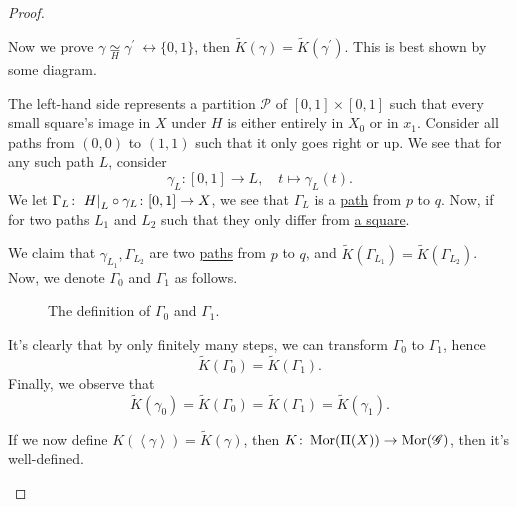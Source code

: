 \begin{proof}
\begin{itemize}
		      Now we prove \(\gamma \underset{H}{\simeq }\gamma ^\prime \  \rel \{0, 1\}\), then \(\widetilde{K} (\gamma ) = \widetilde{K} (\gamma ^\prime )\).
		      This is best shown by some diagram.
		      \begin{figure}[H]
			      \centering
			      \label{fig:pf:thm:Seifert-Van-Kampen-Theorem-on-groupoid-2}
		      \end{figure}
		      The left-hand side represents a partition \(\mathcal{P} \) of \([0, 1]\times [0, 1]\) such that every small square's image in \(X\) under \(H\) is either entirely in \(X_0\)
		      or in \(x_1\). Consider all paths from \((0, 0)\) to \((1, 1)\) such that it only goes right or up. We see that for any such path \(L\), consider
		      \[
			      \gamma _{L} \colon [0, 1]\to L, \quad t\mapsto \gamma _{L} (t).
		      \]
		      We let \(\Gamma _{L} \colon \left.H\right\vert_{L}^{} \circ \gamma _{L} \colon [0, 1]\to X\), we see that \(\Gamma _{L} \) is a \hyperref[def:path]{path} from \(p\) to \(q\). Now, if
		      for two paths \(L_1\) and \(L_2\) such that they only differ from \underline{a square}.
		      \begin{figure}[H]
			      \centering
			      \label{fig:pf:thm:Seifert-Van-Kampen-Theorem-on-groupoid-3}
		      \end{figure}
		      We claim that \(\gamma _{L_1}, \Gamma _{L_2}\) are two \hyperref[def:path]{paths} from \(p\) to \(q\), and \(\widetilde{K} (\Gamma _{L_1}) = \widetilde{K} (\Gamma _{L_2})\).
		      Now, we denote \(\Gamma _0\) and \(\Gamma _1\) as follows.
		      \begin{figure}[H]
			      \centering
			      \caption{The definition of \(\Gamma _0\) and \(\Gamma _1\).}
			      \label{fig:pf:thm:Seifert-Van-Kampen-Theorem-on-groupoid-4}
		      \end{figure}
		      It's clearly that by only finitely many steps, we can transform \(\Gamma _0\) to \(\Gamma _1\), hence
		      \[
			      \widetilde{K} (\Gamma _0) = \widetilde{K} (\Gamma _1).
		      \]
		      Finally, we observe that
		      \[
			      \widetilde{K} (\gamma _0) = \widetilde{K} (\Gamma _0) = \widetilde{K} (\Gamma _1) = \widetilde{K} (\gamma _1).
		      \]

		      If we now define \(K(\left< \gamma  \right> ) = \widetilde{K} (\gamma )\), then \(K\colon \operatorname{Mor} (\Pi (X))\to \operatorname{Mor} (\mathscr{G} )\), then it's well-defined.
	\end{itemize}


\end{proof}
